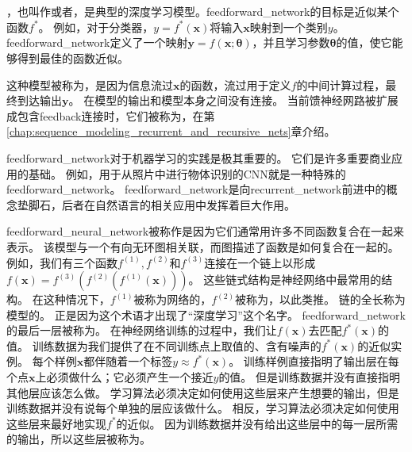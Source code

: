 \chapter{}
\label{chap:deep_feedforward_networks}

，也叫作或者，是典型的深度学习模型。\gls{feedforward_network}的目标是近似某个函数$f^*$。
例如，对于分类器，$y = f^*(\bm{x})$将输入$\bm{x}$映射到一个类别$y$。
\gls{feedforward_network}定义了一个映射$\bm{y} = f(\bm{x}; \bm{\theta})$，并且学习参数$\bm{\theta}$的值，使它能够得到最佳的函数近似。

这种模型被称为，是因为信息流过$\bm{x}$的函数，流过用于定义$f$的中间计算过程，最终到达输出$\bm{y}$。
在模型的输出和模型本身之间没有连接。
当前馈神经网路被扩展成包含\gls{feedback}连接时，它们被称为，在第\ref{chap:sequence_modeling_recurrent_and_recursive_nets}章介绍。

\gls{feedforward_network}对于机器学习的实践是极其重要的。
它们是许多重要商业应用的基础。
例如，用于从照片中进行物体识别的\gls{CNN}就是一种特殊的\gls{feedforward_network}。
\gls{feedforward_network}是向\gls{recurrent_network}前进中的概念垫脚石，后者在自然语言的相关应用中发挥着巨大作用。

\gls{feedforward_neural_network}被称作是因为它们通常用许多不同函数复合在一起来表示。
该模型与一个有向无环图相关联，而图描述了函数是如何复合在一起的。
例如，我们有三个函数$f^{(1)}, f^{(2)}$和$f^{(3)}$连接在一个链上以形成$f(\bm{x}) = f^{(3)}(f^{(2)}(f^{(1)}(\bm{x})) )$。
这些链式结构是神经网络中最常用的结构。
在这种情况下，$f^{(1)}$被称为网络的，$f^{(2)}$被称为，以此类推。
链的全长称为模型的。
正是因为这个术语才出现了``深度学习''这个名字。
\gls{feedforward_network}的最后一层被称为。
在神经网络训练的过程中，我们让$f(\bm{x})$去匹配$f^*(\bm{x})$的值。
训练数据为我们提供了在不同训练点上取值的、含有噪声的$f^*(\bm{x})$的近似实例。
每个样例$\bm{x}$都伴随着一个标签$y\approx f^*(\bm{x})$。
训练样例直接指明了输出层在每个点$\bm{x}$上必须做什么；它必须产生一个接近$y$的值。
但是训练数据并没有直接指明其他层应该怎么做。
学习算法必须决定如何使用这些层来产生想要的输出，但是训练数据并没有说每个单独的层应该做什么。
相反，学习算法必须决定如何使用这些层来最好地实现$f^*$的近似。
因为训练数据并没有给出这些层中的每一层所需的输出，所以这些层被称为。

